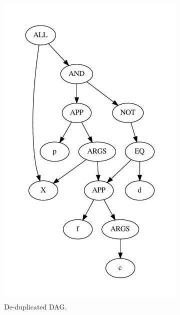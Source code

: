 \documentclass[runningheads]{llncs}
\begin{document}
\begin{figure}
\begin{subfigure}{.39\textwidth}
		\includegraphics[width=\linewidth]{translation-graph}
		\caption{De-duplicated DAG.}
	\end{subfigure}
	\begin{subfigure}{.4\textwidth}
		\centering

\end{subfigure}
\end{figure}
\end{document}
